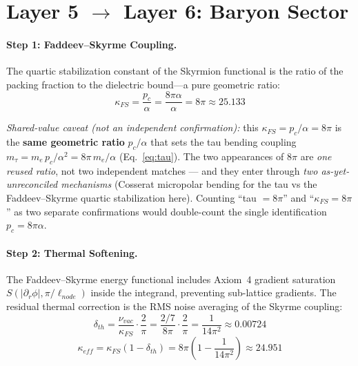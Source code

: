 \section{Layer 5 $\to$ Layer 6: Baryon Sector}
\label{sec:layer56}

\paragraph{Step 1: Faddeev--Skyrme Coupling.}
The quartic stabilization constant of the Skyrmion functional is the ratio of
the packing fraction to the dielectric bound---a pure geometric ratio:
\begin{equation}
    \kappa_{FS} = \frac{p_c}{\alpha} = \frac{8\pi\alpha}{\alpha}
    = \boxed{8\pi}
    \approx 25.133
    \label{eq:kappa_FS}
\end{equation}

\noindent\emph{Shared-value caveat (not an independent confirmation):} this $\kappa_{FS} = p_c/\alpha = 8\pi$ is the \textbf{same geometric ratio} $p_c/\alpha$ that sets the tau bending coupling $m_\tau = m_e\,p_c/\alpha^2 = 8\pi\,m_e/\alpha$ (Eq.~\ref{eq:tau}). The two appearances of $8\pi$ are \emph{one reused ratio}, not two independent matches --- and they enter through \emph{two as-yet-unreconciled mechanisms} (Cosserat micropolar bending for the tau vs the Faddeev--Skyrme quartic stabilization here). Counting ``tau $= 8\pi$'' and ``$\kappa_{FS} = 8\pi$'' as two separate confirmations would double-count the single identification $p_c = 8\pi\alpha$.

\paragraph{Step 2: Thermal Softening.}
The Faddeev--Skyrme energy functional includes Axiom~4 gradient saturation
$S(|\partial_r\phi|, \pi/\ell_{node})$ inside the integrand, preventing
sub-lattice gradients.  The residual thermal correction is the RMS
noise averaging of the Skyrme coupling:
\begin{equation}
    \delta_{th} = \frac{\nu_{vac}}{\kappa_{FS}} \cdot \frac{2}{\pi}
    = \frac{2/7}{8\pi} \cdot \frac{2}{\pi}
    = \frac{1}{14\pi^2}
    \approx 0.00724
    \label{eq:delta_th}
\end{equation}
\begin{equation}
    \kappa_{eff} = \kappa_{FS}(1 - \delta_{th})
    = 8\pi\!\left(1 - \frac{1}{14\pi^2}\right)
    \approx 24.951
    \label{eq:kappa_eff}
\end{equation}

